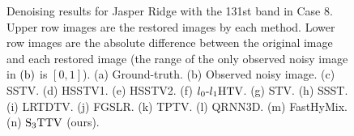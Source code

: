 \begin{figure}[t]
	\vspace{-3mm}
	\caption{Denoising results for Jasper Ridge with the 131st band in Case 8. Upper row images are the restored images by each method. Lower row images are the absolute difference between the original image and each restored image (the range of the only observed noisy image in $\text{(b)}$ is $[0,1]$). (a) Ground-truth. (b) Observed noisy image. (c) SSTV. (d) HSSTV1. (e) HSSTV2. (f) ${l_{0}\text{-}l_{1}\text{HTV}}$. (g) STV. (h) SSST. (i) LRTDTV. (j) FGSLR. (k) TPTV. (l) QRNN3D. (m) FastHyMix. (n) ${\text{S}_{3} \text{TTV}}$ (ours).}
	\label{fig:result_image_Case8_JR}
\end{figure}